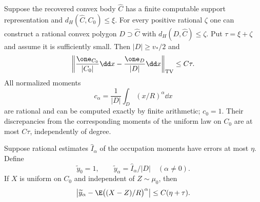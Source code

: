 \begin{lemma}
\label{lem:moment-rational-factor}
Suppose the recovered convex body $\widehat C$ has a finite
computable support representation and
$d_H(\widehat C,C_0)\le\xi$.  For every positive rational $\zeta$
one can construct a rational convex polygon $D\supset\widehat C$
with $d_H(D,\widehat C)\le\zeta$.  Put $\tau=\xi+\zeta$ and assume
it is sufficiently small.  Then $|D|\ge v_*/2$ and
\begin{equation}\label{eq:moment-factor-TV}
 \left\|\frac{\one_{C_0}}{|C_0|}\dd x
              -\frac{\one_D}{|D|}\dd x\right\|_{\rm TV}
       \le C\tau.
\end{equation}
All normalized moments
\begin{equation}\label{eq:moment-rational-factor-moments}
 c_\alpha=\frac1{|D|}\int_D(x/R)^\alpha\dd x
\end{equation}
are rational and can be computed exactly by finite arithmetic;
$c_0=1$.  Their discrepancies from the corresponding moments of
the uniform law on $C_0$ are at most $C\tau$, independently of
degree.

Suppose rational estimates $\widehat I_\alpha$ of the occupation
moments have errors at most $\eta$.  Define
\begin{equation}\label{eq:moment-rational-data}
 \widetilde y_0=1,\qquad
 \widetilde y_\alpha=\widehat I_\alpha/|D|
                              \quad(\alpha\ne0).
\end{equation}
If $X$ is uniform on $C_0$ and independent of $Z\sim\mu_0$, then
\begin{equation}\label{eq:moment-normalization-error}
 \left|\widetilde y_\alpha-
                   \E\bigl((X-Z)/R\bigr)^\alpha\right|
       \le C(\eta+\tau).
\end{equation}
\end{lemma}
